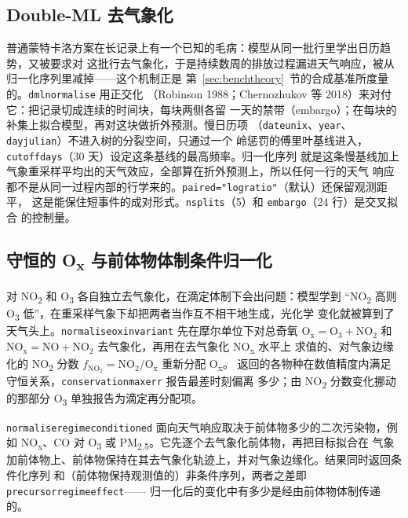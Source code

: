 \documentclass[11pt]{ctexrep}
\newcommand{\codeunderscore}{\textunderscore\allowbreak}
\newcommand{\code}[1]{\texttt{\let\_\codeunderscore #1}}
\newcommand{\NOtwo}{NO\textsubscript{2}}
\newcommand{\NOx}{NO\textsubscript{x}}
\newcommand{\PMtwo}{PM\textsubscript{2.5}}
\begin{document}
\subsection{Double-ML 去气象化}\label{sec:dmltheory}
普通蒙特卡洛方案在长记录上有一个已知的毛病：模型从同一批行里学出日历趋势，又被要求对
这批行去气象化，于是持续数周的排放过程漏进天气响应，被从归一化序列里减掉——这个机制正是
第~\ref{sec:benchtheory}~节的合成基准所度量的。\code{dml\_normalise} 用正交化
（Robinson 1988；Chernozhukov 等 2018）来对付它：把记录切成连续的时间块，每块两侧各留
一天的禁带（embargo）；在每块的补集上拟合模型，再对这块做折外预测。慢日历项
（\code{date\_unix}、\code{year}、\code{day\_julian}）不进入树的分裂空间，只通过一个
岭惩罚的傅里叶基线进入，\code{cutoff\_days}（30 天）设定这条基线的最高频率。归一化序列
就是这条慢基线加上气象重采样平均出的天气效应，全部算在折外预测上，所以任何一行的天气
响应都不是从同一过程内部的行学来的。\code{paired="log\_ratio"}（默认）还保留观测距平，
这是能保住短事件的成对形式。\code{n\_splits}（5）和 \code{embargo}（24 行）是交叉拟合
的控制量。

\subsection{守恒的 O\textsubscript{x} 与前体物体制条件归一化}\label{sec:chemtheory}
对 \NOtwo{} 和 O\textsubscript{3} 各自独立去气象化，在滴定体制下会出问题：模型学到
“\NOtwo{} 高则 O\textsubscript{3} 低”，在重采样气象下却把两者当作互不相干地生成，光化学
变化就被算到了天气头上。\code{normalise\_ox\_invariant} 先在摩尔单位下对总奇氧
$\mathrm{O_x} = \mathrm{O_3} + \mathrm{NO_2}$ 和
$\mathrm{NO_x} = \mathrm{NO} + \mathrm{NO_2}$ 去气象化，再用在去气象化 \NOx{} 水平上
求值的、对气象边缘化的 \NOtwo{} 分数
$f_{\mathrm{NO_2}} = \mathrm{NO_2}/\mathrm{O_x}$ 重新分配 O\textsubscript{x}。
返回的各物种在数值精度内满足守恒关系，\code{conservation\_max\_err} 报告最差时刻偏离
多少；由 \NOtwo{} 分数变化挪动的那部分 O\textsubscript{3} 单独报告为滴定再分配项。

\code{normalise\_regime\_conditioned} 面向天气响应取决于前体物多少的二次污染物，例如
\NOx{}、CO 对 O\textsubscript{3} 或 \PMtwo{}。它先逐个去气象化前体物，再把目标拟合在
气象加前体物上、前体物保持在其去气象化轨迹上，并对气象边缘化。结果同时返回条件化序列
和（前体物保持观测值的）非条件序列，两者之差即 \code{precursor\_regime\_effect}——
归一化后的变化中有多少是经由前体物体制传递的。
\end{document}

